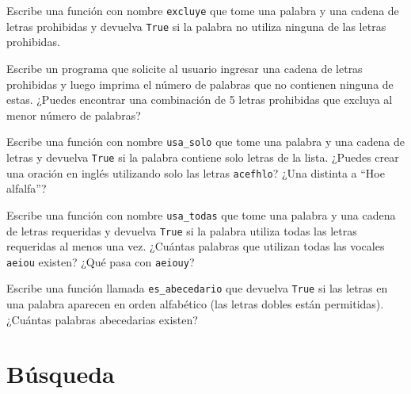 \documentclass[10pt]{book}
\begin{document}
\begin{exercise}

Escribe una función con nombre {\tt excluye}
que tome una palabra y una cadena de letras prohibidas y
devuelva {\tt True} si la palabra no utiliza ninguna de las letras
prohibidas.

Escribe un programa que solicite al usuario ingresar una cadena
de letras prohibidas y luego imprima el número de palabras que
no contienen ninguna de estas.
¿Puedes encontrar una combinación de 5 letras prohibidas que
excluya al menor número de palabras?

\end{exercise}



\begin{exercise}

Escribe una función con nombre \verb"usa_solo" que tome una palabra y una
cadena de letras y devuelva {\tt True} si la palabra contiene
solo letras de la lista.  ¿Puedes crear una oración en inglés utilizando solo las
letras {\tt acefhlo}?  ¿Una distinta a ``Hoe alfalfa''?

\end{exercise}


\begin{exercise}

Escribe una función con nombre \verb"usa_todas" que tome una palabra y una
cadena de letras requeridas y devuelva {\tt True} si la palabra
utiliza todas las letras requeridas al menos una vez.  ¿Cuántas palabras
que utilizan todas las vocales {\tt aeiou} existen?  ¿Qué pasa con {\tt aeiouy}?

\end{exercise}


\begin{exercise}

Escribe una función llamada \verb"es_abecedario" que devuelva
{\tt True} si las letras en una palabra aparecen en orden alfabético
(las letras dobles están permitidas).
¿Cuántas palabras abecedarias existen?


\end{exercise}



\section{Búsqueda}
\label{search}
\end{document}
